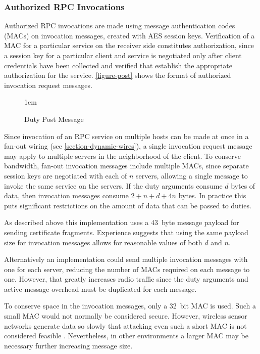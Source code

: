 \subsubsection{Authorized RPC Invocations}

Authorized RPC invocations are made using message authentication codes (MACs) on invocation
messages, created with AES session keys. Verification of a MAC for a particular service on the
receiver side constitutes authorization, since a session key for a particular client and service
is negotiated only after client credentials have been collected and verified that establish the
appropriate authorization for the service. \autoref{figure-post} shows the format of authorized
invocation request messages.

\begin{figure}[t]
  
  \centerline{\raise 1em\box\graph}
  \caption{Duty Post Message}
  \label{figure-post}
\end{figure}

Since invocation of an RPC service on multiple hosts can be made at once in a fan-out wiring
(see \autoref{section-dynamic-wires}), a single invocation request message may apply to multiple
servers in the neighborhood of the client. To conserve bandwidth, fan-out invocation messages
include multiple MACs, since separate session keys are negotiated with each of $n$ servers,
allowing a single message to invoke the same service on the servers. If the duty arguments
consume $d$ bytes of data, then invocation messages consume $2 + n + d + 4n$ bytes. In practice
this puts significant restrictions on the amount of data that can be passed to duties.

As described above this implementation uses a 43~byte message payload for sending certificate
fragments. Experience suggests that using the same payload size for invocation messages
allows for reasonable values of both $d$ and $n$.

Alternatively an implementation could send multiple invocation messages with one for each
server, reducing the number of MACs required on each message to one. However, that greatly
increases radio traffic since the duty arguments and active message overhead must be duplicated
for each message.

To conserve space in the invocation messages, only a 32~bit MAC is used. Such a small MAC would
not normally be considered secure. However, wireless sensor networks generate data so slowly
that attacking even such a short MAC is not considered feasible
\cite{karlog-tinysec-2004,luk-minisec-2007}. Nevertheless, in other environments a larger MAC may be
necessary further increasing message size.


